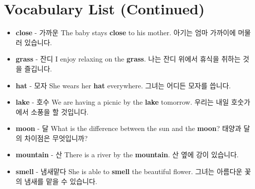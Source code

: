 \documentclass{article}
\begin{document}
\section*{Vocabulary List (Continued)}
\begin{addmargin}[1em]{1em}
    \begin{itemize}
        \item \fontsize{12pt}{14pt}\selectfont \textbf{close} - 가까운 \newline
        The baby stays \textbf{close} to his mother. \newline
        아기는 엄마 가까이에 머물러 있습니다.
        
        \item \fontsize{12pt}{14pt}\selectfont \textbf{grass} - 잔디 \newline
        I enjoy relaxing on the \textbf{grass}. \newline
        나는 잔디 위에서 휴식을 취하는 것을 즐깁니다.
        
        \item \fontsize{12pt}{14pt}\selectfont \textbf{hat} - 모자 \newline
        She wears her \textbf{hat} everywhere. \newline
        그녀는 어디든 모자를 씁니다.
        
        \item \fontsize{12pt}{14pt}\selectfont \textbf{lake} - 호수 \newline
        We are having a picnic by the \textbf{lake} tomorrow. \newline
        우리는 내일 호숫가에서 소풍을 할 것입니다.
        
        \item \fontsize{12pt}{14pt}\selectfont \textbf{moon} - 달 \newline
        What is the difference between the sun and the \textbf{moon}? \newline
        태양과 달의 차이점은 무엇입니까?
        
        \item \fontsize{12pt}{14pt}\selectfont \textbf{mountain} - 산 \newline
        There is a river by the \textbf{mountain}. \newline
        산 옆에 강이 있습니다.
        
        \item \fontsize{12pt}{14pt}\selectfont \textbf{smell} - 냄새맡다 \newline
        She is able to \textbf{smell} the beautiful flower. \newline
        그녀는 아름다운 꽃의 냄새를 맡을 수 있습니다.
        

\end{itemize}
\end{addmargin}
\end{document}
